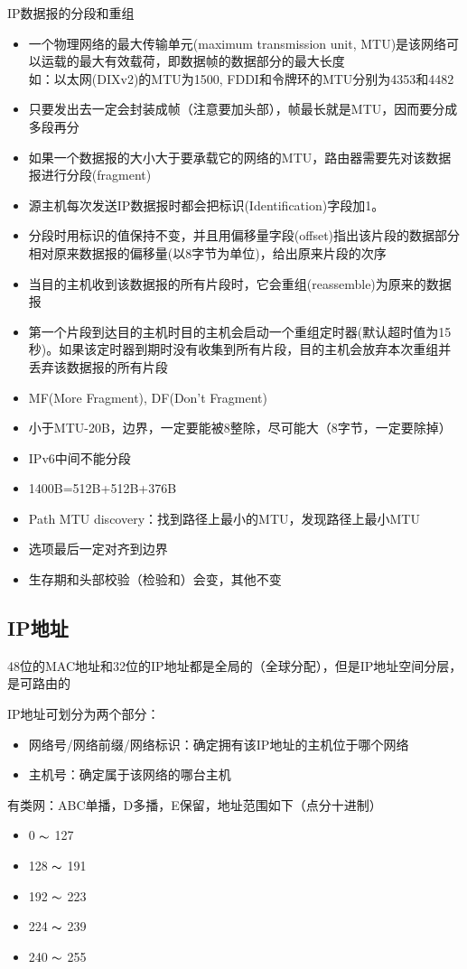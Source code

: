 IP数据报的分段和重组
\begin{itemize}
\item 一个物理网络的最大传输单元(maximum transmission unit, MTU)是该网络可以运载的最大有效载荷，即数据帧的数据部分的最大长度\\
如：以太网(DIXv2)的MTU为1500, FDDI和令牌环的MTU分别为4353和4482
\item 只要发出去一定会封装成帧（注意要加头部），帧最长就是MTU，因而要分成多段再分
\item 如果一个数据报的大小大于要承载它的网络的MTU，路由器需要先对该数据报进行分段(fragment)
\item 源主机每次发送IP数据报时都会把标识(Identification)字段加1。
\item 分段时用标识的值保持不变，并且用偏移量字段(offset)指出该片段的数据部分相对原来数据报的偏移量(以8字节为单位)，给出原来片段的次序
\item 当目的主机收到该数据报的所有片段时，它会重组(reassemble)为原来的数据报
\item 第一个片段到达目的主机时目的主机会启动一个重组定时器(默认超时值为15秒)。如果该定时器到期时没有收集到所有片段，目的主机会放弃本次重组并丢弃该数据报的所有片段
\item MF(More Fragment), DF(Don't Fragment)
\item 小于MTU-20B，边界，一定要能被8整除，尽可能大（8字节，一定要除掉）
\item IPv6中间不能分段
\item 1400B=512B+512B+376B
\item Path MTU discovery：找到路径上最小的MTU，发现路径上最小MTU
\item 选项最后一定对齐到边界
\item 生存期和头部校验（检验和）会变，其他不变
\end{itemize}

\subsection{IP地址}
48位的MAC地址和32位的IP地址都是全局的（全球分配），但是IP地址空间分层，是可路由的

IP地址可划分为两个部分：
\begin{itemize}
	\item 网络号/网络前缀/网络标识：确定拥有该IP地址的主机位于哪个网络
	\item 主机号：确定属于该网络的哪台主机
\end{itemize}

有类网：ABC单播，D多播，E保留，地址范围如下（点分十进制）
\begin{itemize}
	\item 0 $\thicksim$ 127
	\item 128 $\thicksim$ 191
	\item 192 $\thicksim$ 223
	\item 224 $\thicksim$ 239
	\item 240 $\thicksim$ 255
\end{itemize}

